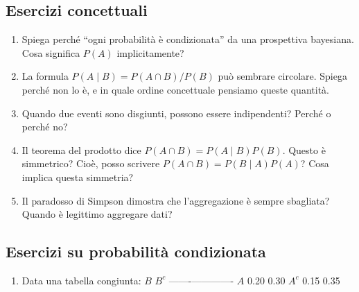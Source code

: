 \documentclass[
  italian,
  letterpaper,
  a4paper,
  11pt,
  open=any]{scrbook}
\theoremstyle{plain}
\theoremstyle{definition}
\theoremstyle{definition}
\theoremstyle{remark}
\begin{document}
\begin{tcolorbox}[enhanced jigsaw, arc=.35mm, bottomrule=.15mm, bottomtitle=1mm, breakable, colback=white, colbacktitle=quarto-callout-important-color!10!white, colframe=quarto-callout-important-color-frame, coltitle=black, left=2mm, leftrule=.75mm, opacityback=0, opacitybacktitle=0.6, rightrule=.15mm, title=\textcolor{quarto-callout-important-color}{\faExclamation}\hspace{0.5em}{Problemi}, titlerule=0mm, toprule=.15mm, toptitle=1mm]

\subsection*{Esercizi concettuali}\label{esercizi-concettuali}

\begin{enumerate}
\def\labelenumi{\arabic{enumi}.}
\item
  Spiega perché ``ogni probabilità è condizionata'' da una prospettiva
  bayesiana. Cosa significa \(P(A)\) implicitamente?
\item
  La formula \(P(A \mid B) = P(A \cap B) / P(B)\) può sembrare
  circolare. Spiega perché non lo è, e in quale ordine concettuale
  pensiamo queste quantità.
\item
  Quando due eventi sono disgiunti, possono essere indipendenti? Perché
  o perché no?
\item
  Il teorema del prodotto dice \(P(A \cap B) = P(A \mid B) P(B)\).
  Questo è simmetrico? Cioè, posso scrivere
  \(P(A \cap B) = P(B \mid A) P(A)\)? Cosa implica questa simmetria?
\item
  Il paradosso di Simpson dimostra che l'aggregazione è sempre
  sbagliata? Quando è legittimo aggregare dati?
\end{enumerate}

\subsection*{Esercizi su probabilità
condizionata}\label{esercizi-su-probabilituxe0-condizionata}

\begin{enumerate}
\def\labelenumi{\arabic{enumi}.}
\setcounter{enumi}{5}
\item
  Data una tabella congiunta: \textbar{} \textbar{} \(B\) \textbar{}
  \(B^c\) \textbar{}
  \textbar-------\textbar------\textbar-------\textbar{} \textbar{}
  \(A\) \textbar{} 0.20 \textbar{} 0.30 \textbar{} \textbar{} \(A^c\)
  \textbar{} 0.15 \textbar{} 0.35 \textbar{}


\end{enumerate}
\end{tcolorbox}
\end{document}
